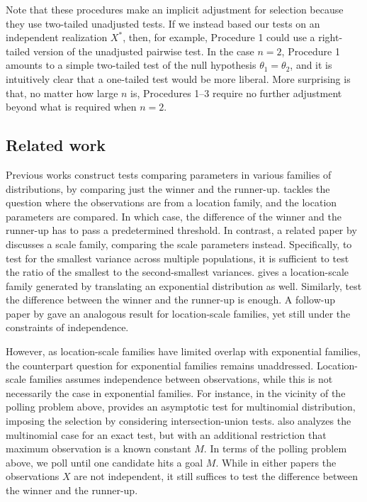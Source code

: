 \documentclass[11pt]{article}
\theoremstyle{definition}
\theoremstyle{custom}
\newcommand{\WFcomment}[1]{{\color{red}{(WF: \bf \sc #1) }}}
\begin{document}
Note that these procedures make an implicit adjustment for selection because they use two-tailed unadjusted tests. If we instead based our tests on an independent realization $X^*$, then, for example, Procedure 1 could use a right-tailed version of the unadjusted pairwise test. In the case $n = 2$, Procedure 1 amounts to a simple two-tailed test of the null hypothesis $\theta_1 = \theta_2$, and it is intuitively clear that a one-tailed test would be more liberal. More surprising is that, no matter how large $n$ is, Procedures 1--3 require no further adjustment beyond what is required when $n = 2$. 

\subsection{Related work}

\WFcomment{Merge this discussion with my discussion from NSF.}

Previous works construct tests comparing parameters in various families of distributions, by comparing just the winner and the runner-up. \citet{Gutmann:1987fk} tackles the question where the observations are from a location family, and the location parameters are compared. In which case, the difference of the winner and the runner-up has to pass a predetermined threshold. In contrast, a related paper by \citet{Karnnan:2009iv} discusses a scale family, comparing the scale parameters instead. Specifically, to test for the smallest variance across multiple populations, it is sufficient to test the ratio of the smallest to the second-smallest variances. \citet{Bofinger:1991hv} gives a location-scale family generated by translating an exponential distribution as well. Similarly, test the difference between the winner and the runner-up is enough. A follow-up paper by \citet{Maymin:1992fz} gave an analogous result for location-scale families, yet still under the constraints of independence.

However, as location-scale families have limited overlap with exponential families, the counterpart question for exponential families remains unaddressed. Location-scale families assumes independence between observations, while this is not necessarily the case in exponential families. For instance, in the vicinity of the polling problem above, \citet{Nettleton:2009ht} provides an asymptotic test for multinomial distribution, imposing the selection by considering intersection-union tests. \citet{Ng:2007cn} also analyzes the multinomial case for an exact test, but with an additional restriction that maximum observation is a known constant $M$. In terms of the polling problem above, we poll until one candidate hits a goal $M$. While in either papers the observations $X$ are not independent, it still suffices to test the difference between the winner and the runner-up.
\end{document}
